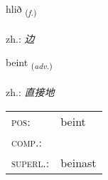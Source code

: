 \documentclass[frontgrid, backgrid]{flacards}\usepackage[]{graphicx}\usepackage[]{xcolor}
\begin{document}
\renewcommand{\flhead}{\vskip5pt \fboxsep=0pt {\small\bfseries\footnotesize Nafnorð | 名词}}
\renewcommand{\fcfoot}{\vskip5pt \fboxsep=0pt \hspace{2pt}{\small\bfseries\footnotesize 1K}}

\renewcommand{\blhead}{\vskip5pt {\small\bfseries\footnotesize Nafnorð | 名词 }}
\renewcommand{\bcfoot}{\vskip5pt \hspace{2pt}{\small\bfseries\footnotesize 1K}}


{hlið \small{\textsubscript{(\textit{f.})}} \\[1ex] %
\textphonetic{[l̥ɪːð]} \\
zh.: \emph{边} \\  [2ex]
\renewcommand*{\arraystretch}{0.8}
}

\renewcommand{\flhead}{\vskip5pt \fboxsep=0pt {\small\bfseries\footnotesize Atviksorð | 副词}}
\renewcommand{\fcfoot}{\vskip5pt \fboxsep=0pt \hspace{2pt}{\small\bfseries\footnotesize 1K}}

\renewcommand{\blhead}{\vskip5pt {\small\bfseries\footnotesize Atviksorð | 副词 }}
\renewcommand{\bcfoot}{\vskip5pt \hspace{2pt}{\small\bfseries\footnotesize 1K}}


{beint \small{\textsubscript{(\textit{adv.})}} \\[1ex] %
\textphonetic{[pein̥t]} \\
zh.: \emph{直接地} \\  [2ex]
\renewcommand*{\arraystretch}{0.8}
\begin{tabular}{ll}
\textsc{pos}: & beint \\ 
\textsc{comp.}: &  \\ 
\textsc{superl.}: & beinast \\
\end{tabular}
}
\end{document}
